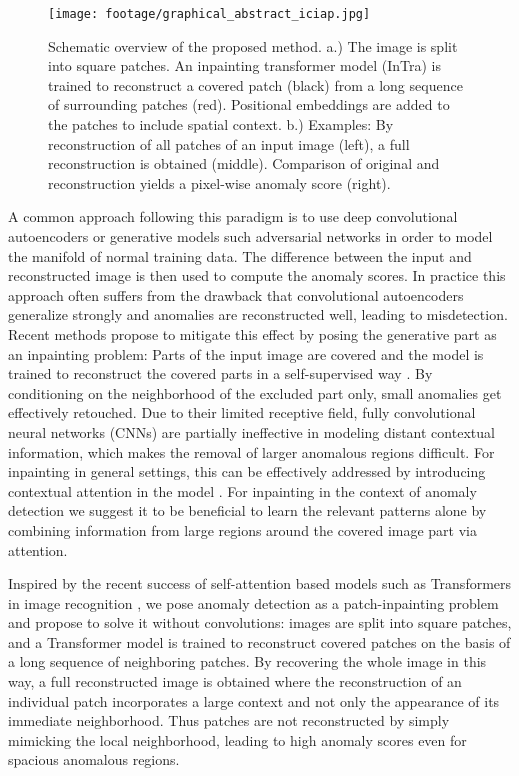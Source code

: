 \documentclass[runningheads]{llncs}
\begin{document}
\begin{figure}[t]
	\centering
	\texttt{[image: footage/graphical\_abstract\_iciap.jpg]}
	\caption{Schematic overview of the proposed method.
	 a.) The image is split into square patches. An inpainting transformer model (InTra) is trained to reconstruct a covered patch (black) from a long sequence of surrounding patches (red). Positional embeddings are added to the patches to include spatial context. b.) Examples: By reconstruction of all patches of an input image (left), a full reconstruction is obtained (middle). Comparison of original and reconstruction yields a pixel-wise anomaly score (right).
	}
	\label{fig:graphical_abstract}
\end{figure}

A common approach following this paradigm is to use deep convolutional autoencoders or generative models such adversarial networks in order to model the manifold of normal training data. The difference between the input and reconstructed image is then used to compute the anomaly scores. In practice this approach often suffers from the drawback that convolutional autoencoders generalize strongly and anomalies are reconstructed well, leading to misdetection. Recent methods propose to mitigate this effect by posing the generative part as an inpainting problem: Parts of the input image are covered and the model is trained to reconstruct the covered parts in a self-supervised way \cite{Bhattad2018DetectingAF,8614226,ZAVRTANIK2021107706,DBLP:journals/corr/abs-2010-01942}. By conditioning on the neighborhood of the excluded part only, small anomalies get effectively retouched. Due to their limited receptive field, fully convolutional neural networks (CNNs) are partially ineffective in modeling distant contextual information, which makes the removal of larger anomalous regions difficult. For inpainting in general settings, this can be effectively addressed by introducing contextual attention in the model \cite{Yu_2018_CVPR}. For inpainting in the context of anomaly detection we suggest it to be beneficial to learn the relevant patterns alone by combining information from large regions around the covered image part via attention.

Inspired by the recent success of self-attention based models such as Transformers \cite{NIPS2017_3f5ee243} in image recognition \cite{dosovitskiy2020}, we pose anomaly detection as a patch-inpainting problem and propose to solve it without convolutions: images are split into square patches, and a Transformer model is trained to reconstruct covered patches on the basis of a long sequence of neighboring patches. By recovering the whole image in this way, a full reconstructed image is obtained where the reconstruction of an individual patch incorporates a large context and not only the appearance of its immediate neighborhood. Thus patches are not reconstructed by simply mimicking the local neighborhood, leading to high anomaly scores even for spacious anomalous regions.
\end{document}
